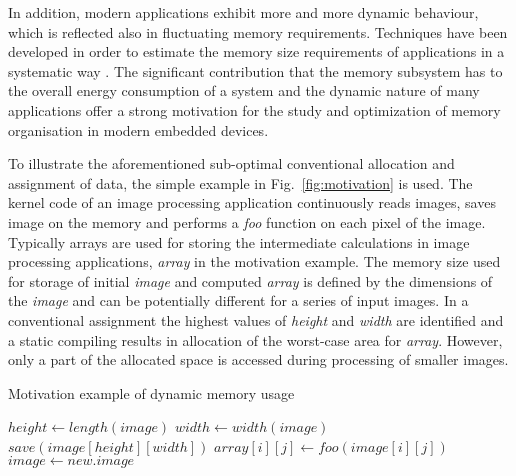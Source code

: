 \documentclass{acm_proc_article-sp}
\begin{document}
In addition, modern applications exhibit more and more dynamic behaviour, which is reflected also in fluctuating memory requirements. Techniques have been developed in order to estimate the memory size requirements of applications in a systematic way \cite{Ang13}. The significant contribution that the memory subsystem has to the overall energy consumption of a system and the dynamic nature of many applications offer a strong motivation for the study and optimization of memory organisation in modern embedded devices.

To illustrate the aforementioned sub-optimal conventional allocation and assignment of data, the simple example in Fig.~\ref{fig:motivation} is used. The kernel code of an image processing application continuously reads images, saves image on the memory and performs a \textit{foo} function on each pixel of the image. Typically arrays are used for storing the intermediate calculations in image processing applications, \textit{array} in the motivation example. The memory size used for storage of initial \textit{image} and computed \textit{array} is defined by the dimensions of the \textit{image} and can be potentially different for a series of input images. In a conventional assignment the highest values of \textit{height} and \textit{width} are identified and a static compiling results in allocation of the worst-case area for \textit{array}. However, only a part of the allocated space is accessed during processing of smaller images. 

\begin{algorithm}[H]
\caption{Motivation example of dynamic memory usage}
 \label{fig:motivation}
 \begin{algorithmic}[1]
		\STATE $height \gets length(image)$
		\STATE $width \gets width(image)$
		\STATE $save(image[height][width])$
					\STATE $array[i][j] \gets foo(image[i][j])$
				\ENDFOR
			\ENDFOR
		\STATE $image \gets new.image$	
	\ENDWHILE
 \end{algorithmic}
\end{algorithm}
\end{document}

